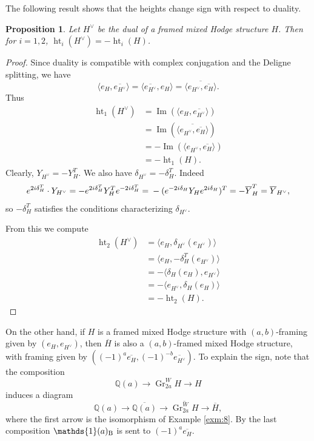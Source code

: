 \documentclass[11pt,a4paper]{amsart}
\newcommand{\Betti}{\text{\rm B}}
\newcommand{\Q}{\mathds{Q}}
\newcommand{\bfone}{{\mathds{1}}}
\DeclareMathOperator {\Gr} {Gr}
\DeclareMathOperator{\im}{Im}
\DeclareMathOperator{\Ht}{ht}
\numberwithin{equation}{section}
\theoremstyle{plain}
\newtheorem{prop}{Proposition}[section]
\theoremstyle{definition}
\begin{document}
The following result shows that the heights change sign with respect to duality.
\begin{prop}\label{prop-dual-ht-2}
Let $H^{\vee}$ be the dual of a framed mixed Hodge structure $H$. Then
for $i=1,2$, $\Ht_{i}(H^{\vee})=-\Ht_{i}(H)$.
\end{prop}
\begin{proof}
Since duality is compatible with complex conjugation and the Deligne
splitting, we have 
\begin{displaymath}
  \langle e_{H},\overline {e_{H^{\vee}}} \rangle=
  \langle \overline {e_{H^{\vee}}},e_{H} \rangle=
  \overline {\langle e_{H^{\vee}},\overline {e_{H}} \rangle}.
\end{displaymath}
Thus
\begin{align*}
  \Ht_{1}(H^{\vee})&=\im\left(\langle e_{H}, \overline{e_{H^{\vee}}}\rangle\right)\\
&=\im \left(\overline {\langle e_{H^{\vee}},\overline {e_{H}} \rangle}\right)\\
&=-\im \left(\langle e_{H^{\vee}},\overline {e_{H}} \rangle\right)\\
& =-\Ht_{1}(H).
\end{align*}
Clearly,  $Y_{H^{\vee}}=-Y^{T}_{H}$. We also have
$\delta_{H^{\vee}}=-\delta^{T}_{H}$. Indeed
\begin{displaymath}
  e^{2i\delta_{H}^{T}}\cdot Y_{H^{\vee}}=
  -e^{2i\delta_{H}^{T}}Y_{H}^{T} e^{-2i\delta_{H}^{T}}=\\
  -(e^{-2i\delta_{H}}Y_{H} e^{2i\delta_{H}})^{T}=
  -\overline Y_{H}^{T}=\overline Y_{H^{\vee}},
\end{displaymath}
so $-\delta^{T}_{H}$ satisfies the conditions characterizing $\delta
_{H^{\vee}}$. 

From this we compute
\begin{align*}
\Ht_{2}(H^{\vee})&=\langle e_{H}, \delta_{H^{\vee}}(e_{H^{\vee}})\rangle\\
&=\langle e_{H}, -\delta^{T}_{H}(e_{H^{\vee}})\rangle\\
&=-\langle \delta_{H}(e_{H}), e_{H^{\vee}}\rangle\\
&=-\langle e_{H^{\vee}}, \delta_{H}(e_{H})\rangle\\
&=-\Ht_{2}(H).
\end{align*}
\end{proof}
On the other hand, if $H$ is a framed mixed Hodge structure with
$(a,b)$-framing given by $(e_{H}, e_{H^{\vee}})$, then $\overline{H}$
is also a $(a,b)$-framed mixed Hodge structure, with framing given by
$((-1)^{a}\overline{e_{H}},
(-1)^{-b}\overline{e_{H^{\vee}}})$.
To explain the sign, note that the composition 
\begin{displaymath}
  \Q(a) \longrightarrow \Gr_{2a}^WH \longrightarrow H 
\end{displaymath}
induces a diagram
\begin{displaymath}
  \Q(a) \longrightarrow \overline {\Q(a)} \longrightarrow
  \overline{\Gr_{2a}^WH}
  \longrightarrow \overline{H},
\end{displaymath}
where the first arrow is the isomorphism of Example \ref{exm:8}. By
the last composition $\bfone(a)_{\Betti}$ is sent to $(-1)^a\overline {e_H}$.
\end{document}

